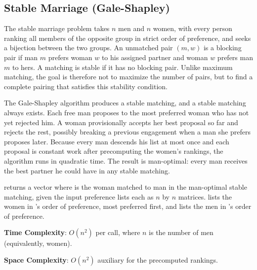 \subsection{Stable Marriage (Gale-Shapley)}
\label{sec:4.6.8}
The stable marriage problem takes $n$ men and $n$ women, with every person ranking all members of the opposite group in strict order of preference, and seeks a bijection between the two groups. An unmatched pair $(m, w)$ is a blocking pair if man $m$ prefers woman $w$ to his assigned partner and woman $w$ prefers man $m$ to hers. A matching is stable if it has no blocking pair. Unlike maximum matching, the goal is therefore not to maximize the number of pairs, but to find a complete pairing that satisfies this stability condition.

The Gale-Shapley algorithm produces a stable matching, and a stable matching always exists. Each free man proposes to the most preferred woman who has not yet rejected him. A woman provisionally accepts her best proposal so far and rejects the rest, possibly breaking a previous engagement when a man she prefers proposes later. Because every man descends his list at most once and each proposal is constant work after precomputing the women's rankings, the algorithm runs in quadratic time. The result is man-optimal: every man receives the best partner he could have in any stable matching.

\begin{compactitem}
  \item {} returns a vector  where  is the woman matched to man  in the man-optimal stable matching, given the input preference lists each as $n$ by $n$ matrices.  lists the women in 's order of preference, most preferred first, and  lists the men in 's order of preference.
\end{compactitem}

\textbf{Time Complexity}: $O(n^{2})$ per call, where $n$ is the number of men (equivalently, women).

\textbf{Space Complexity}: $O(n^{2})$ auxiliary for the precomputed rankings.

